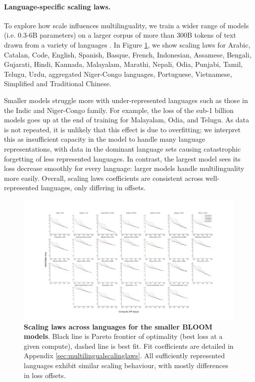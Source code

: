 \paragraph{Language-specific scaling laws.} To explore how scale influences multilinguality, we train a wider range of models (i.e. 0.3-6B parameters) on a larger corpus of more than 300B tokens of text drawn from a variety of languages \cite{roots}. In Figure \ref{fig:multilingualscaling}, we show scaling laws for Arabic, Catalan, Code, English, Spanish, Basque, French, Indonesian, Assamese, Bengali, Gujarati, Hindi, Kannada, Malayalam, Marathi, Nepali, Odia, Punjabi, Tamil, Telugu, Urdu, aggregated Niger-Congo languages, Portuguese, Vietnamese, Simplified and Traditional Chinese. 

Smaller models struggle more with under-represented languages such as those in the Indic and Niger-Congo family. For example, the loss of the sub-1 billion models goes up at the end of training for Malayalam, Odia, and Telugu. As data is not repeated, it is unlikely that this effect is due to overfitting; we interpret this as insufficient capacity in the model to handle many language representations, with data in the dominant language sets causing catastrophic forgetting of less represented languages. In contrast, the largest model sees its loss decrease smoothly for every language: larger models handle multilinguality more easily. Overall, scaling laws coefficients are consistent across well-represented languages, only differing in offsets.

\begin{figure}[t]
    \centering
    \centerline{\includegraphics[width=1.1\textwidth]{figures/multilingual_scaling.pdf}}
    \caption{\textbf{Scaling laws across languages for the smaller BLOOM models}. Black line is Pareto frontier of optimality (best loss at a given compute), dashed line is best fit. Fit coefficients are detailed in Appendix \ref{sec:multilingualscalinglaws}. All sufficiently represented languages exhibit similar scaling behaviour, with mostly differences in loss offsets.}
    \label{fig:multilingualscaling}
\end{figure}
